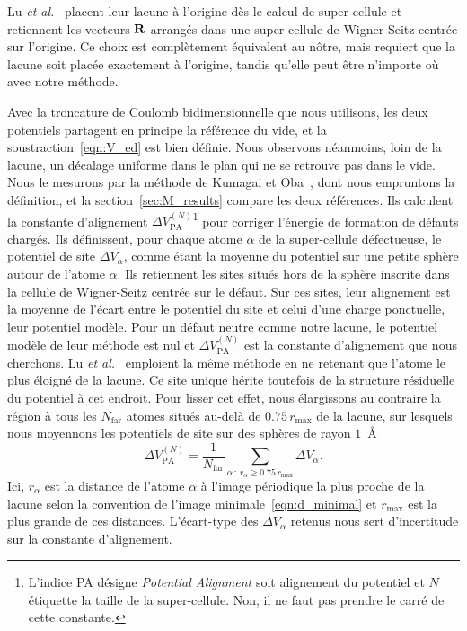 Lu \textit{et al.}~\cite{luInitioElectrondefectInteractions2020} placent leur lacune à l'origine dès le calcul de super-cellule et retiennent les vecteurs $\mathbf{R}$ arrangés dans une super-cellule de Wigner-Seitz centrée sur l'origine. Ce choix est complètement équivalent au nôtre, mais requiert que la lacune soit placée exactement à l'origine, tandis qu'elle peut être n'importe où avec notre méthode.

\bigskip
{}

Avec la troncature de Coulomb bidimensionnelle que nous utilisons, les deux potentiels partagent en principe la référence du vide, et la soustraction~\eqref{eqn:V_ed} est bien définie. Nous observons néanmoins, loin de la lacune, un décalage uniforme dans le plan qui ne se retrouve pas dans le vide. Nous le mesurons par la méthode de Kumagai et Oba~\cite{kumagaiElectrostaticsbasedFinitesizeCorrections2014}, dont nous empruntons la définition, et la section~\ref{sec:M_results} compare les deux références. Ils calculent la constante d'alignement $\Delta V_\text{PA}^{(N)}$\footnote{L'indice PA désigne \textit{Potential Alignment} soit \og alignement du potentiel \fg{} et $N$ étiquette la taille de la super-cellule. Non, il ne faut pas prendre le carré de cette constante.} pour corriger l'énergie de formation de défauts chargés. Ils définissent, pour chaque atome $\alpha$ de la super-cellule défectueuse, le potentiel de site $\Delta V_\alpha$, comme étant la moyenne du potentiel sur une petite sphère autour de l'atome $\alpha$. Ils retiennent les sites situés hors de la sphère inscrite dans la cellule de Wigner-Seitz centrée sur le défaut. Sur ces sites, leur alignement est la moyenne de l'écart entre le potentiel du site et celui d'une charge ponctuelle, leur potentiel modèle. Pour un défaut neutre comme notre lacune, le potentiel modèle de leur méthode est nul et $\Delta V_\text{PA}^{(N)}$ est la constante d'alignement que nous cherchons. Lu \textit{et al.}~\cite{luEfficientInitioCalculations2019} emploient la même méthode en ne retenant que l'atome le plus éloigné de la lacune. Ce site unique hérite toutefois de la structure résiduelle du potentiel à cet endroit. Pour lisser cet effet, nous élargissons au contraire la région à tous les $N_\text{far}$ atomes situés au-delà de $0.75\,r_\text{max}$ de la lacune, sur lesquels nous moyennons les potentiels de site sur des sphères de rayon $1$~\AA{}
\begin{equation}
    \Delta V_\text{PA}^{(N)} = \frac{1}{N_\text{far}}\sum_{\alpha\,:\,r_\alpha\geq 0.75\,r_\text{max}}\Delta V_\alpha.\label{eqn:VPA}
\end{equation}
Ici, $r_\alpha$ est la distance de l'atome $\alpha$ à l'image périodique la plus proche de la lacune selon la convention de l'image minimale~\eqref{eqn:d_minimal} et $r_\text{max}$ est la plus grande de ces distances. L'écart-type des $\Delta V_\alpha$ retenus nous sert d'incertitude sur la constante d'alignement.

